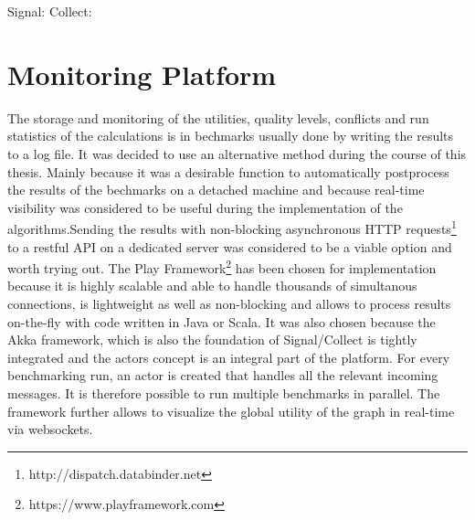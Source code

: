 Signal:
Collect:

\section{Monitoring Platform}

The  storage and monitoring of the utilities, quality levels, conflicts and run statistics of the calculations is in bechmarks usually done by writing the results to a log file. It was decided to use an alternative method during the course of this thesis. Mainly because it was a desirable function  to automatically postprocess the results of the bechmarks on a detached machine and because real-time visibility was considered to be useful during the implementation of the algorithms.\newline Sending the results with non-blocking asynchronous HTTP requests\footnote{http://dispatch.databinder.net} to a restful API on a dedicated server was considered to be a viable option and worth trying out. The Play Framework\footnote{https://www.playframework.com} has been chosen for implementation because it is highly scalable and able to handle thousands of simultanous connections, is lightweight as well as non-blocking and allows to process results on-the-fly with code written in Java or Scala. It was also chosen because the Akka framework, which is also the foundation of Signal/Collect is tightly integrated and the actors concept is an integral part of the platform. For every benchmarking run, an actor is created that handles all the relevant incoming messages. It is therefore possible to run multiple benchmarks in parallel. The framework further allows to visualize the global utility of the graph in real-time via websockets. %



